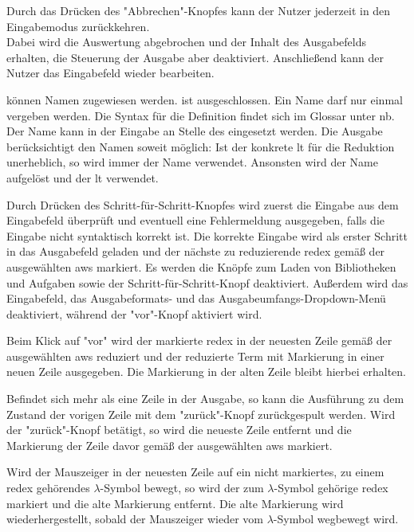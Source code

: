 \documentclass[parskip=full,11pt,twoside]{scrartcl}
\begin{document}
Durch das Drücken des "Abbrechen"-Knopfes kann der Nutzer jederzeit in den Eingabemodus zurückkehren.\\
Dabei wird die Auswertung abgebrochen und der Inhalt des Ausgabefelds erhalten, die Steuerung der Ausgabe aber deaktiviert.
Anschließend kann der Nutzer das Eingabefeld wieder bearbeiten.

 können Namen zugewiesen werden.
 ist ausgeschlossen. Ein Name darf nur einmal vergeben werden.
Die Syntax für die Definition findet sich im Glossar unter \gls{nb}.
Der Name kann in der Eingabe an Stelle des  eingesetzt werden.
Die Ausgabe berücksichtigt den Namen soweit möglich:
Ist der konkrete \gls{lt} für die Reduktion unerheblich, so wird immer der Name verwendet.
Ansonsten wird der Name aufgelöst und der \gls{lt} verwendet.

Durch Drücken des Schritt-für-Schritt-Knopfes wird zuerst die Eingabe aus dem Eingabefeld überprüft und eventuell eine Fehlermeldung ausgegeben, falls die Eingabe nicht syntaktisch korrekt ist.
Die korrekte Eingabe wird als erster Schritt in das Ausgabefeld geladen und der nächste zu reduzierende \gls{redex} gemäß der ausgewählten \gls{aws} markiert.
Es werden die Knöpfe zum Laden von Bibliotheken und Aufgaben sowie der Schritt-für-Schritt-Knopf deaktiviert.
Außerdem wird das Eingabefeld, das Ausgabeformats- und das Ausgabeumfangs-Dropdown-Menü deaktiviert, während der "vor"-Knopf aktiviert wird.

Beim Klick auf "vor" wird der markierte \gls{redex} in der neuesten Zeile gemäß der ausgewählten \gls{aws} reduziert und der reduzierte Term mit Markierung in einer neuen Zeile ausgegeben.
Die Markierung in der alten Zeile bleibt hierbei erhalten.

Befindet sich mehr als eine Zeile in der Ausgabe, so kann die Ausführung zu dem Zustand der vorigen Zeile mit dem "zurück"-Knopf zurückgespult werden.
Wird der "zurück"-Knopf betätigt, so wird die neueste Zeile entfernt und die Markierung der Zeile davor gemäß der ausgewählten \gls{aws} markiert.

Wird der Mauszeiger in der neuesten Zeile auf ein nicht markiertes, zu einem \gls{redex} gehörendes $\lambda$-Symbol bewegt, so wird der zum $\lambda$-Symbol gehörige \gls{redex} markiert und die alte Markierung entfernt. Die alte Markierung wird wiederhergestellt, sobald der Mauszeiger wieder vom $\lambda$-Symbol wegbewegt wird.
\end{document}
